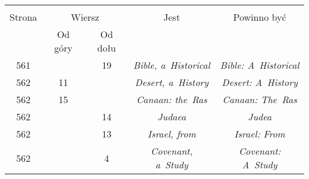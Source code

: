 \documentclass[a4paper,11pt]{article}
\begin{document}
\begin{center}
  \begin{tabular}{|c|c|c|c|c|}
    \hline
    & \multicolumn{2}{c|}{} & & \\
    Strona & \multicolumn{2}{c|}{Wiersz} & Jest
                              & Powinno być \\ \cline{2-3}
    & Od góry & Od dołu & & \\
    \hline
    561 & & 19 & \emph{Bible, a~Historical}
           & \emph{Bible: A~Historical} \\
    562 & 11 & & \emph{Desert, a~History} & \emph{Desert: A~History} \\
    562 & 15 & & \emph{Canaan: the~Ras} & \emph{Canaan: The~Ras} \\
    562 & & 14 & \emph{Judaea} & \emph{Judea} \\
    562 & & 13 & \emph{Israel, from} & \emph{Israel: From} \\
    562 & &  4 & \emph{Covenant, a~Study} & \emph{Covenant: A~Study} \\
    \hline
  \end{tabular}
\end{center}

\vspace{\spaceTwo}
\end{document}
